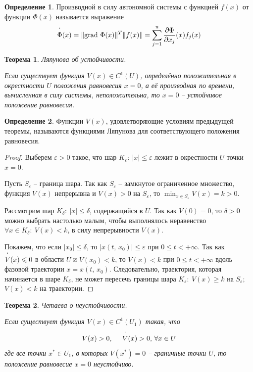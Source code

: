 \documentclass[a4paper,12pt]{article}
\renewcommand{\leq}{\ensuremath{\leqslant}}
\renewcommand{\geq}{\ensuremath{\geqslant}}
\theoremstyle{plain}
\newtheorem{theorem}{Теорема}[section]
\theoremstyle{definition}
\newtheorem{definition}{Определение}[section]
\theoremstyle{remark}
\begin{document}
\begin{definition}
	Производной в силу автономной системы с функцией $f(x)$ от функции $\Phi(x)$ называется выражение
	\[\overset{`}{\Phi}(x) = \|\text{grad }\Phi(x)\|^T\|f(x)\| = \sum_{j = 1}^n \frac{\partial \Phi}{\partial x_j}(x)f_j(x)\]
\end{definition}

\begin{theorem}
	Ляпунова об устойчивости.

	Если существует функция $V(x)  \in C^1(U)$, определённо положительная в окрестности $U$ положения равновесия $x = 0$, а её производная по времени, вычисленная в силу системы, неположительна, то $x = 0$ -- устойчивое положение равновесия.
\end{theorem}

\begin{definition}
	Функции $V(x)$, удовлетворяющие условиям предыдущей теоремы, называются функциями Ляпунова для соответствующего положения равновесия.
\end{definition}

\begin{proof}
	Выберем $\varepsilon > 0$ такое, что шар $K_\varepsilon:\: |x| \leq \varepsilon$ лежит в окрестности $U$ точки $x = 0$.

	Пусть $S_\varepsilon$ -- граница шара. Так как $S_\varepsilon$ -- замкнутое ограниченное множество, функция $V(x)$ непрерывна и $V(x) > 0$ на $S_\varepsilon$, то $\min_{x \in S_\varepsilon} V(x) = k > 0$.

	Рассмотрим шар $K_\delta:\: |x| \leq \delta$, содержащийся в $U$. Так как $V(0) = 0$, то $\delta > 0$ можно выбрать настолько малым, чтобы выполнялось неравенство $\forall x \in K_\delta:\: V(x) < k$, в силу непрерывности $V(x)$.

	Покажем, что если $|x_0| \leq \delta$, то $|x(t,\, x_0)| \leq \varepsilon$ при $0 \leq t < +\infty$. Так как $\overset{`}{V}(x) \leq 0$ в области $U$ и $V(x_0) < k$, то $V(x) < k$ при $0 \leq t < +\infty$ вдоль фазовой траектории $x = x(t,\, x_0)$. Следовательно, траектория, которая начинается в шаре $K_\delta$, не может пересечь границы шара $K_\varepsilon:\: V(x) \geq k$ на $S_\varepsilon$; $V(x) < k$ на траектории.
\end{proof}

\begin{theorem}
	Четаева о неустойчивости.

	Если существует функция $V(x) \in C^1(U_1)$ такая, что
	\[V(x) > 0,\;\;\;\;\; \overset{`}{V}(x) > 0,\, \forall x \in U\]
	где все точки $x^* \in U_1$, в которых $V(x^*) = 0$ -- граничные точки $U$, то положение равновесие $x = 0$ неустойчиво.
\end{theorem}
\end{document}
